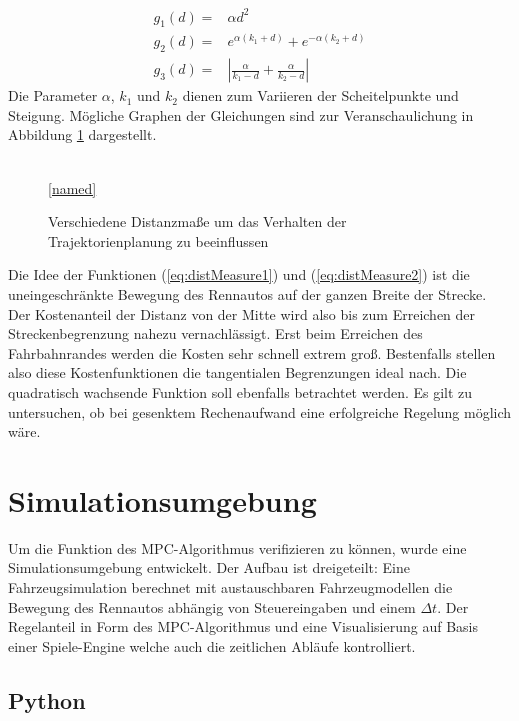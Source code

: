 \documentclass{like}
\begin{document}
\begin{eqnarray}
	g_1(d) = &\alpha d^2 \\
	g_2(d) = &e^{\alpha (k_1 + d)} + e^{-\alpha(k_2 + d)} \label{eq:distMeasure1}\\
	g_3(d) = &|\frac{\alpha}{k_1-d} + \frac{\alpha}{k_2 - d}| \label{eq:distMeasure2}
\end{eqnarray}
Die Parameter $\alpha$, $k_1$ und $k_2$ dienen zum Variieren der Scheitelpunkte und Steigung.
Mögliche Graphen der Gleichungen sind zur Veranschaulichung in Abbildung \ref{fig:elasticCost} dargestellt.

\begin{figure}[ht!]
	\centering
	 
	\\
	\ref{named}
	\caption{Verschiedene Distanzmaße um das Verhalten der Trajektorienplanung zu beeinflussen}
	\label{fig:elasticCost}
\end{figure}

Die Idee der Funktionen (\ref{eq:distMeasure1}) und (\ref{eq:distMeasure2}) ist die uneingeschränkte Bewegung des Rennautos auf der ganzen Breite der Strecke. Der Kostenanteil der Distanz von der Mitte wird also bis zum Erreichen der Streckenbegrenzung nahezu vernachlässigt. Erst beim Erreichen des Fahrbahnrandes werden die Kosten sehr schnell extrem groß. Bestenfalls stellen also diese Kostenfunktionen die tangentialen Begrenzungen ideal nach. Die quadratisch wachsende Funktion soll ebenfalls betrachtet werden. Es gilt zu untersuchen, ob bei gesenktem Rechenaufwand eine erfolgreiche Regelung möglich wäre.

\chapter{Simulationsumgebung}
Um die Funktion des \ac{MPC}-Algorithmus verifizieren zu können, wurde eine Simulationsumgebung entwickelt. Der Aufbau ist dreigeteilt: Eine Fahrzeugsimulation berechnet mit austauschbaren Fahrzeugmodellen die Bewegung des Rennautos abhängig von Steuereingaben und einem $\Delta t$. Der Regelanteil in Form des \ac{MPC}-Algorithmus und eine Visualisierung auf Basis einer Spiele-Engine welche auch die zeitlichen Abläufe kontrolliert. 

\section{Python}
\end{document}
